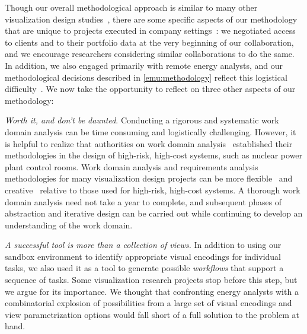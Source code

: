 
Though our overall methodological approach is similar to many other visualization design studies~\cite{McKenna2014,Sedlmair2012}, there are some specific aspects of our methodology that are unique to projects executed in company settings~\cite{Sedlmair2011}: we negotiated access to clients and to their portfolio data at the very beginning of our collaboration, and we encourage researchers considering similar collaborations to do the same.
In addition, we also engaged primarily with remote energy analysts, and our methodological decisions described in \autoref{emu:methodology} reflect this logistical difficulty~\cite{Brehmer2014a}.
We now take the opportunity to reflect on three other aspects of our methodology:

 {\it Worth it, and don't be daunted}. 
Conducting a rigorous and systematic work domain analysis can be time consuming and logistically challenging.
However, it is helpful to realize that authorities on work domain analysis~\cite{Vicente1999} established their methodologies in the design of high-risk, high-cost systems, such as nuclear power plant control rooms.
Work domain analysis and requirements analysis methodologies for many visualization design projects can be more flexible~\cite{McNamara2014} and creative~\cite{Goodwin2013} relative to those used for high-risk, high-cost systems.
A thorough work domain analysis need not take a year to complete, and subsequent phases of abstraction and iterative design can be carried out while continuing to develop an understanding of the work domain.

 {\it A successful tool is more than a collection of views.}
In addition to using our sandbox environment to identify appropriate visual encodings for individual tasks, we also used it as a tool to generate possible {\it workflows} that support a sequence of tasks.
Some visualization research projects stop before this step, but we argue for its importance.
We thought that confronting energy analysts with a combinatorial explosion of possibilities from a large set of visual encodings and view parametrization options would fall short of a full solution to the problem at hand.


